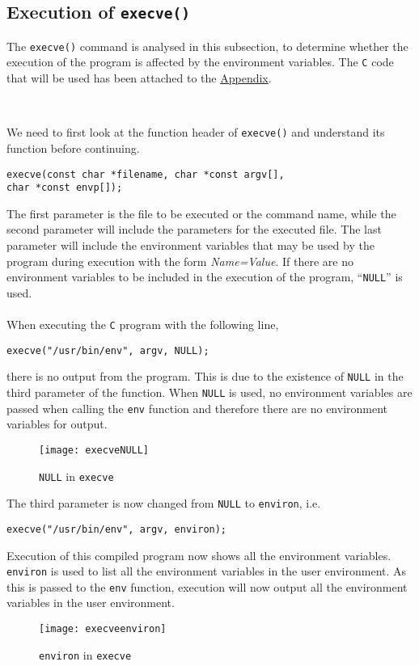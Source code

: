 \documentclass[a4paper,12pt]{article}
\begin{document}
\subsection{Execution of \texttt{execve()}}
{\par \noindent The \texttt{execve()} command is analysed in this subsection, to determine whether the execution of the program is affected by the environment variables. The \texttt{C} code that will be used has been attached to the \hyperref[Appsec:3.3]{Appendix}.}\\
{\par \noindent We need to first look at the function header of \texttt{execve()} and understand its function before continuing.}
\begin{verbatim}
execve(const char *filename, char *const argv[], 
char *const envp[]);
\end{verbatim}
The first parameter is the file to be executed or the command name, while the second parameter will include the parameters for the executed file. The last parameter will include the environment variables that may be used by the program during execution with the form \textit{Name=Value}. If there are no environment variables to be included in the execution of the program, ``\texttt{NULL}'' is used.\\\\
When executing the \texttt{C} program with the following line,
\begin{verbatim}
execve("/usr/bin/env", argv, NULL);
\end{verbatim}
there is no output from the program. This is due to the existence of \texttt{NULL} in the third parameter of the function. When \texttt{NULL} is used, no environment variables are passed when calling the \texttt{env} function and therefore there are no environment variables for output.\\
\begin{figure}[H]
	\centering
	\texttt{[image: execveNULL]}
	\caption{\texttt{NULL} in \texttt{execve}}
	\label{fig:execvenull}
\end{figure}
{\par \noindent The third parameter is now changed from \texttt{NULL} to \texttt{environ}, i.e. 
\begin{verbatim}execve("/usr/bin/env", argv, environ);\end{verbatim} 
Execution of this compiled program now shows all the environment variables. \texttt{environ} is used to list all the environment variables in the user environment. As this is passed to the \texttt{env} function, execution will now output all the environment variables in the user environment.}
\begin{figure}[H]
	\centering
	\texttt{[image: execveenviron]}
	\caption{\texttt{environ} in \texttt{execve}}
	\label{fig:execveenviron}
\end{figure}
\end{document}
